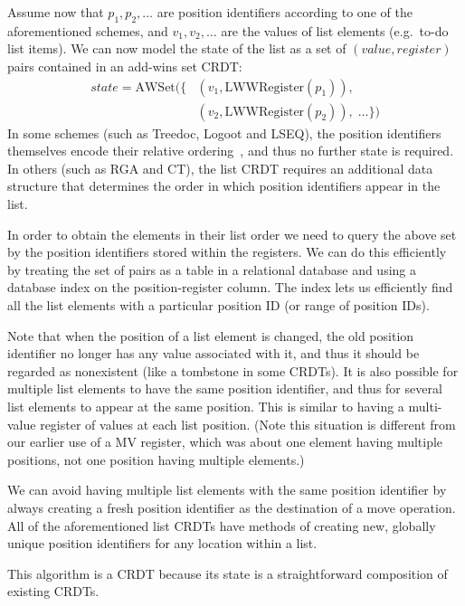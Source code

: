 \documentclass[sigplan,10pt]{acmart}
\begin{document}
Assume now that $p_1, p_2, \dots$ are position identifiers according to one of the aforementioned schemes, and $v_1, v_2, \dots$ are the values of list elements (e.g.\ to-do list items).
We can now model the state of the list as a set of $(\mathit{value}, \mathit{register})$ pairs contained in an add-wins set CRDT:
\begin{align*}
\mathit{state} = \mathrm{AWSet}(\{ & (v_1, \mathrm{LWWRegister}(p_1)),\\
    & (v_2, \mathrm{LWWRegister}(p_2)), \;\dots\})
\end{align*}
In some schemes (such as Treedoc, Logoot and LSEQ), the position identifiers themselves encode their relative ordering~\cite{Interleaving}, and thus no further state is required.
In others (such as RGA and CT), the list CRDT requires an additional data structure that determines the order in which position identifiers appear in the list.

In order to obtain the elements in their list order we need to query the above set by the position identifiers stored within the registers.
We can do this efficiently by treating the set of pairs as a table in a relational database and using a database index on the position-register column.
The index lets us efficiently find all the list elements with a particular position ID (or range of position IDs).

Note that when the position of a list element is changed, the old position identifier no longer has any value associated with it, and thus it should be regarded as nonexistent (like a tombstone in some CRDTs).
It is also possible for multiple list elements to have the same position identifier, and thus for several list elements to appear at the same position.
This is similar to having a multi-value register of values at each list position.
(Note this situation is different from our earlier use of a MV register, which was about one element having multiple positions, not one position having multiple elements.)

We can avoid having multiple list elements with the same position identifier by always creating a fresh position identifier as the destination of a move operation.
All of the aforementioned list CRDTs have methods of creating new, globally unique position identifiers for any location within a list.

This algorithm is a CRDT because its state is a straightforward composition of existing CRDTs.
\end{document}
